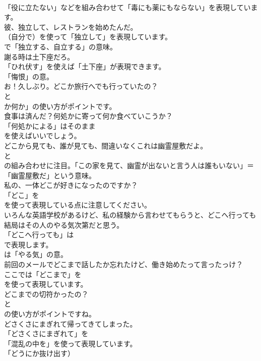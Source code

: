 \documentclass[8pt]{extreport}
\begin{document}
\begin{CJK}{UTF8}{min}
\\	「役に立たない」などを組み合わせて「毒にも薬にもならない」を表現しています。	
\\	彼、独立して、レストランを始めたんだ。 
\\	（自分で）を使って「独立して」を表現しています。
\\	で「独立する、自立する」の意味。	
\\	謝る時は土下座だろ｡ 
\\	「ひれ伏す」を使えば「土下座」が表現できます。
\\	「悔恨」の意。	
\\	お！久しぶり。どこか旅行へでも行っていたの？ 
\\	と
\\	か何か」の使い方がポイントです。	
\\	食事は済んだ？何処かに寄って何か食べていこうか？ 
\\	「何処かによる」はそのまま
\\	を使えばいいでしょう。	
\\	どこから見ても、誰が見ても、間違いなくこれは幽霊屋敷だよ。 
\\	と
\\	の組み合わせに注目。「この家を見て、幽霊が出ないと言う人は誰もいない」＝「幽霊屋敷だ」という意味。	
\\	私の、一体どこが好きになったのですか？ 
\\	「どこ」を
\\	を使って表現している点に注意してください。	
\\	いろんな英語学校があるけど、私の経験から言わせてもらうと、どこへ行っても結局はその人のやる気次第だと思う。 
\\	「どこへ行っても」は 
\\	で表現します。
\\	は「やる気」の意。	
\\	前回のメールでどこまで話したか忘れたけど、働き始めたって言ったっけ？ 
\\	ここでは「どこまで」を 
\\	を使って表現しています。	
\\	どこまでの切符かったの？ 
\\	と
\\	の使い方がポイントですね。	
\\	どさくさにまぎれて帰ってきてしまった。 
\\	「どさくさにまぎれて」を
\\	「混乱の中を」を使って表現しています。
\\	「どうにか抜け出す）	

\end{CJK}
\end{document}
